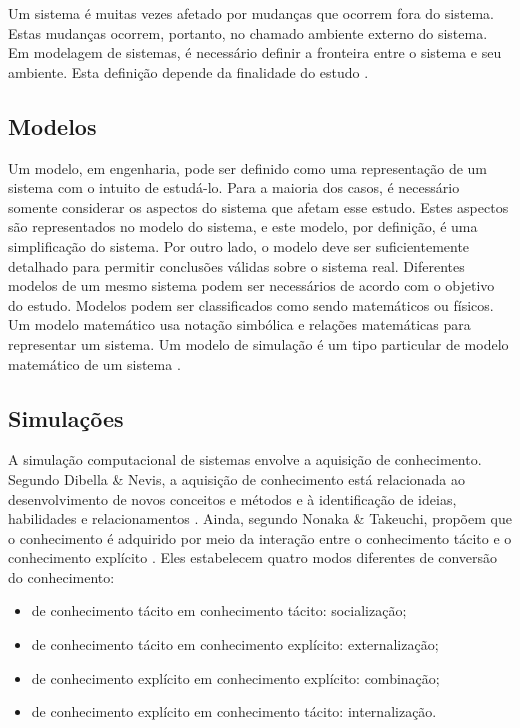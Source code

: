 Um sistema é muitas vezes afetado por mudanças que ocorrem fora do sistema. Estas mudanças ocorrem, portanto, no chamado ambiente externo do sistema. Em modelagem de sistemas, é necessário definir a fronteira entre o sistema e seu ambiente. Esta definição depende da finalidade do estudo \cite{miyagi2006introduccao}.

\subsection{Modelos}

Um modelo, em engenharia, pode ser definido como uma representação de um sistema com o intuito de estudá-lo. Para a maioria dos casos, é necessário somente considerar os aspectos do sistema que afetam esse estudo. Estes aspectos são representados no modelo do sistema, e este modelo, por definição, é uma simplificação do sistema. Por outro lado, o modelo deve ser suficientemente detalhado para permitir conclusões válidas sobre o sistema real. Diferentes modelos de um mesmo sistema podem ser necessários de acordo com o objetivo do estudo. Modelos podem ser classificados como sendo matemáticos ou físicos. Um modelo matemático usa notação simbólica e relações matemáticas para representar um sistema. Um modelo de simulação é um tipo particular de modelo matemático de um sistema \cite{miyagi2006introduccao}.

\subsection{Simulações}

A simulação computacional de sistemas envolve a aquisição de conhecimento. Segundo Dibella \& Nevis, a aquisição de conhecimento está relacionada ao desenvolvimento de novos conceitos e métodos e à identificação de ideias, habilidades e relacionamentos \cite{dibella1999organizaccoes}. Ainda, segundo Nonaka \& Takeuchi, propõem que o conhecimento é adquirido por meio da interação entre o conhecimento tácito e o conhecimento explícito \cite{nonaka1997criaccao}. Eles estabelecem quatro modos diferentes de conversão do conhecimento:

\begin{itemize}
\item de conhecimento tácito em conhecimento tácito: socialização; 
\item de conhecimento tácito em conhecimento explícito: externalização; 
\item de conhecimento explícito em conhecimento explícito: combinação; 
\item de conhecimento explícito em conhecimento tácito: internalização. 
\end{itemize}

